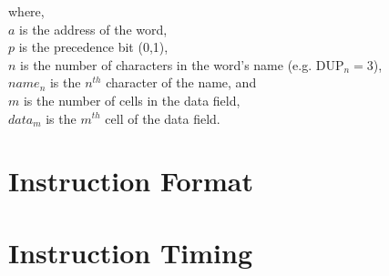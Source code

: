 where, \\
$a$ is the address of the word, \\
$p$ is the precedence bit (0,1), \\
$n$ is the number of characters in the word's name (e.g. DUP$_n = 3$), \\
$name_n$ is the $n^{th}$ character of the name, and \\
$m$ is the number of cells in the data field, \\
$data_m$ is the $m^{th}$ cell of the data field.

%
\section{Instruction Format}

%
\section{Instruction Timing}

